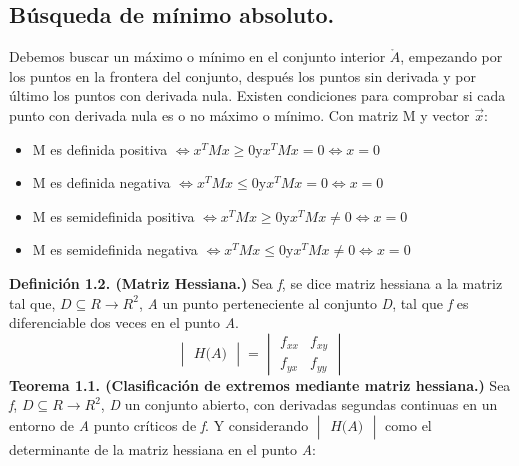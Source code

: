\documentclass[a4paper,10pt]{article}
\begin{document}
\subsection{Búsqueda de mínimo absoluto.}

Debemos buscar un máximo o mínimo en el conjunto interior $\mathring{A}$, empezando por los puntos en la frontera del conjunto, después los puntos sin derivada y por último los puntos con derivada nula. Existen condiciones para comprobar si cada punto con derivada nula es o no máximo o mínimo. Con matriz M y vector $\vec{x}$:
\begin{itemize}
\item M es definida positiva $\Longleftrightarrow x^TMx \geq 0$y$x^TMx=0\Leftrightarrow x=0$
\item M es definida negativa  $\Longleftrightarrow x^TMx \leq0$y$x^TMx=0\Leftrightarrow x=0$
\item M es semidefinida positiva  $\Longleftrightarrow x^TMx \geq0$y$x^TMx\neq0\Leftrightarrow x=0$
\item M es semidefinida negativa  $\Longleftrightarrow x^TMx \leq0$y$x^TMx\neq0\Leftrightarrow x=0$
\end{itemize}
\textbf{Definición 1.2. (Matriz Hessiana.)}
Sea \textit{f}, se dice matriz hessiana a la matriz tal que, $\textit{D} \subseteq R \rightarrow R^2$, \textit{A} un punto perteneciente al conjunto \textit{D}, tal que \textit{f} es diferenciable dos veces en el punto \textit{A}.
\[
\begin{vmatrix}\textit{H(A)}\end{vmatrix}=
\begin{vmatrix}
    f_{xx} & f_{xy} \\
    f_{yx} & f_{yy}
\end{vmatrix}
\]
\textbf{Teorema 1.1. (Clasificación de extremos mediante matriz hessiana.)}
Sea \textit{f}, $\textit{D} \subseteq R \rightarrow R^2$, \textit{D}  un conjunto abierto, con derivadas segundas continuas en un entorno de \textit{A} punto críticos de \textit{f}. Y considerando $\begin{vmatrix}\textit{H(A)}\end{vmatrix}$ como el determinante de la matriz hessiana en el punto \textit{A}:
\end{document}

